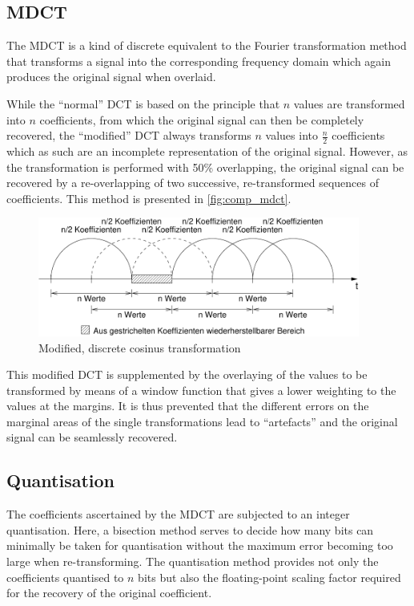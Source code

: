 \documentclass[a4paper,12pt,BCOR6mm,bibtotoc,idxtotoc]{scrbook}
\begin{document}
\subsection{MDCT}

The MDCT is a kind of discrete equivalent to the Fourier
transformation method that transforms a signal into the corresponding
frequency domain which again produces the original signal when overlaid.

While the ``normal'' DCT is based on the principle that $n$ values are
transformed into $n$ coefficients, from which the original signal can then be
completely recovered, the ``modified'' DCT always transforms $n$ values into
$\frac{n}{2}$ coefficients which as such are an incomplete representation of
the original signal. However, as the transformation is performed with 50\%
overlapping, the original signal can be recovered by a re-overlapping of two
successive, re-transformed sequences of coefficients. This method is presented
in \autoref{fig:comp_mdct}.

\begin{figure}[htb] \begin{center} \includegraphics[width=300pt]{bilder/mdct} \end{center} \caption{Modified, discrete cosinus transformation} \label{fig:comp_mdct} \end{figure}

This modified DCT is supplemented by the overlaying of the values to be transformed by means of a window function that gives a lower weighting to the values at the margins. It is thus prevented that the different errors on the marginal areas of the single transformations lead to ``artefacts'' and the original signal can be seamlessly recovered.

\subsection{Quantisation}

The coefficients ascertained by the MDCT are subjected to an integer quantisation. Here, a bisection method serves to decide how many bits can minimally be taken for quantisation without the maximum error becoming too large when re-transforming. The quantisation method provides not only the coefficients quantised to $n$ bits but also the floating-point scaling factor required for the recovery of the original coefficient.
\end{document}
